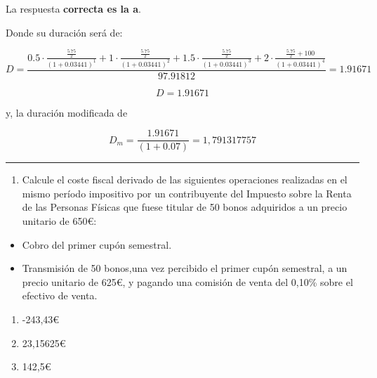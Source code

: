 \documentclass[
  letterpaper,
  DIV=11,
  numbers=noendperiod]{scrartcl}
\providecommand{\tightlist}{%
  \setlength{\itemsep}{0pt}\setlength{\parskip}{0pt}}\usepackage{longtable,booktabs,array}
\begin{document}
\begin{tcolorbox}[enhanced jigsaw, colframe=quarto-callout-tip-color-frame, opacityback=0, opacitybacktitle=0.6, colback=white, leftrule=.75mm, bottomtitle=1mm, colbacktitle=quarto-callout-tip-color!10!white, coltitle=black, toprule=.15mm, left=2mm, breakable, toptitle=1mm, titlerule=0mm, title=\textcolor{quarto-callout-tip-color}{\faLightbulb}\hspace{0.5em}{Solución}, arc=.35mm, rightrule=.15mm, bottomrule=.15mm]

La respuesta \textbf{correcta es la a}.

Donde su duración será de:

\[D=\frac{0.5\cdot \frac{\frac{5.75}{2}}{\left(1+0.03441\right)^1}+1\cdot \frac{\frac{5.75}{2}}{\left(1+0.03441\right)^2}+1.5\cdot \frac{\frac{5.75}{2}}{\left(1+0.03441\right)^3}+2\cdot \frac{\frac{5.75}{2}+100}{\left(1+0.03441\right)^4}}{97.91812}=1.91671\]

\[D=1.91671\]

y, la duración modificada de

\[D_m=\frac{1.91671}{\left(1+0.07\right)}=1,791317757\]

\end{tcolorbox}

\begin{center}\rule{0.5\linewidth}{0.5pt}\end{center}

\begin{enumerate}
\def\labelenumi{\arabic{enumi}.}
\setcounter{enumi}{2}
\tightlist
\item
  Calcule el coste fiscal derivado de las siguientes operaciones
  realizadas en el mismo período impositivo por un contribuyente del
  Impuesto sobre la Renta de las Personas Físicas que fuese titular de
  50 bonos adquiridos a un precio unitario de 650€:
\end{enumerate}

\begin{itemize}
\item
  Cobro del primer cupón semestral.
\item
  Transmisión de 50 bonos,una vez percibido el primer cupón semestral, a
  un precio unitario de 625€, y pagando una comisión de venta del 0,10\%
  sobre el efectivo de venta.
\end{itemize}

\begin{enumerate}
\def\labelenumi{\alph{enumi}.}
\item
  -243,43€
\item
  23,15625€
\item
  142,5€
\end{enumerate}
\end{document}
